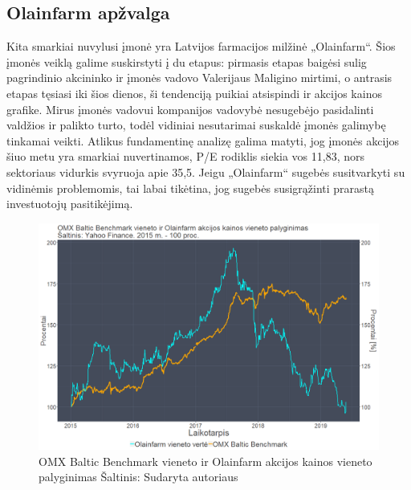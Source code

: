 \documentclass[12pt]{article}
\begin{document}
\subsection{Olainfarm apžvalga}
Kita smarkiai nuvylusi įmonė yra Latvijos farmacijos milžinė „Olainfarm“. Šios įmonės veiklą galime suskirstyti į du etapus: pirmasis etapas baigėsi sulig pagrindinio akcininko ir įmonės vadovo Valerijaus Maligino mirtimi, o antrasis etapas tęsiasi iki šios dienos, ši tendenciją puikiai atsispindi ir akcijos kainos grafike. Mirus įmonės vadovui kompanijos vadovybė nesugebėjo pasidalinti valdžios ir palikto turto, todėl vidiniai nesutarimai suskaldė įmonės galimybę tinkamai veikti. Atlikus fundamentinę analizę galima matyti, jog įmonės akcijos šiuo metu yra smarkiai nuvertinamos, P/E rodiklis siekia vos 11,83, nors sektoriaus vidurkis svyruoja apie 35,5. Jeigu „Olainfarm“ sugebės susitvarkyti su vidinėmis problemomis, tai labai tikėtina, jog sugebės susigrąžinti prarastą investuotojų pasitikėjimą.

\begin{figure}[H]
\captionsetup{justification=centering}
\center
\includegraphics[scale=0.4]{OLF.png}
\caption{OMX Baltic Benchmark vieneto ir Olainfarm akcijos kainos vieneto palyginimas \newline
Šaltinis: Sudaryta autoriaus}
\end{figure}
\end{document}
